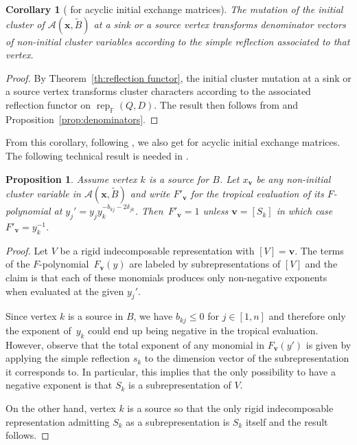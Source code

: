 \documentclass[pdftex]{sigma}
\newcommand{\bfv}{\mathbf{v}}
\newcommand{\bfx}{\mathbf{x}}
\newcommand{\cA}{\mathcal{A}}
\newcommand{\FF}{\mathbb{F}}
\newcommand{\rep}{\operatorname{rep}}
\newtheorem{Corollary}[Theorem]{Corollary}
\newtheorem{Proposition}[Theorem]{Proposition}
 { \theoremstyle{definition}
\newtheorem{Definition}[Theorem]{Definition}
\newtheorem{Note}[Theorem]{Note}
\newtheorem{Example}[Theorem]{Example}
\newtheorem{Remark}[Theorem]{Remark} }
\begin{document}
  \begin{Corollary}[{\cite[Conjecture 2.8]{reading-stella}} for acyclic initial exchange matrices]
    The mutation of the initial cluster of $\cA(\bfx,\widetilde{B})$ at a sink or a source vertex transforms denominator vectors of non-initial cluster variables according to the simple reflection associated to that vertex.
  \end{Corollary}
  \begin{proof}
    By Theorem~\ref{th:reflection functor}, the initial cluster mutation at a sink or a source vertex transforms cluster characters according to the associated reflection functor on $\rep_{\FF}(Q,D)$.
    The result then follows from \cite[Proposition 2.1]{dlab-ringel} and Proposition~\ref{prop:denominators}.
  \end{proof}

  From this corollary, following \cite[Proposition 2.10]{reading-stella}, we also get \cite[Conjecture 2.7]{reading-stella} for acyclic initial exchange matrices.
  The following technical result is needed in \cite{rupel-stella-williams}.

  \begin{Proposition}
    \label{prop:principal F-polynomials}
    Assume vertex $k$ is a source for $B$.
    Let $x_\bfv$ be any non-initial cluster variable in $\cA(\bfx,\widetilde{B})$ and write $F'_\bfv$ for the tropical evaluation of its $F$-polynomial at $y_j'=y_jy_k^{-b_{kj}-2\delta_{jk}}$.
    Then~$F'_\bfv=1$ unless $\bfv=[S_k]$ in which case $F'_\bfv=y_k^{-1}$.
  \end{Proposition}
  \begin{proof}
    Let $V$ be a rigid indecomposable representation with $[V]=\bfv$.
    The terms of the $F$-polynomial~$F_\bfv(y)$ are labeled by subrepresentations of $[V]$ and the claim is that each of these monomials produces only non-negative exponents when evaluated at the given $y_j'$.

    Since vertex $k$ is a source in $B$, we have $b_{kj}\leq 0$ for $j\in[1,n]$ and therefore only the exponent of~$y_k$ could end up being negative in the tropical evaluation.
    However, observe that the total exponent of any monomial in $F_\bfv(y')$ is given by applying the simple reflection $s_k$ to the dimension vector of the subrepresentation it corresponds to.
    In particular, this implies that the only possibility to have a negative exponent is that $S_k$ is a subrepresentation of $V$.

    On the other hand, vertex $k$ is a source so that the only rigid indecomposable representation admitting $S_k$ as a subrepresentation is $S_k$ itself and the result follows.
  \end{proof}
\end{document}

